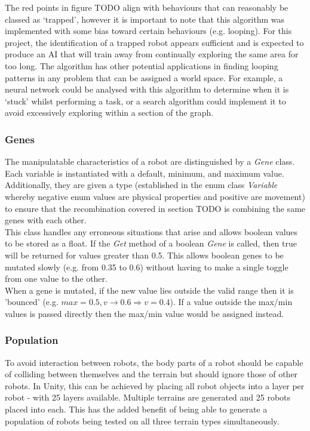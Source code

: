 \documentclass{article}
\begin{document}
The red points in figure TODO align with behaviours that can reasonably be classed as ‘trapped’, however it is important to note that this algorithm was implemented with some bias toward certain behaviours (e.g. looping). For this project, the identification of a trapped robot appears sufficient and is expected to produce an AI that will train away from continually exploring the same area for too long. The algorithm has other potential applications in finding looping patterns in any problem that can be assigned a world space. For example, a neural network could be analysed with this algorithm to determine when it is ‘stuck’ whilst performing a task, or a search algorithm could implement it to avoid excessively exploring within a section of the graph. 


\subsubsection{Genes}
The manipulatable characteristics of a robot are distinguished by a \textit{Gene} class. Each variable is instantiated with a default, minimum, and maximum value. Additionally, they are given a type (established in the enum class \textit{Variable} whereby negative enum values are physical properties and positive are movement) to ensure that the recombination covered in section TODO is combining the same genes with each other. \\
This class handles any erroneous situations that arise and allows boolean values to be stored as a float. If the \textit{Get} method of a boolean \textit{Gene} is called, then true will be returned for values greater than 0.5. This allows boolean genes to be mutated slowly (e.g. from 0.35 to 0.6) without having to make a single toggle from one value to the other. \\
When a gene is mutated, if the new value lies outside the valid range then it is 'bounced' (e.g. $max=0.5, v\rightarrow0.6 \Rightarrow v=0.4$). If a value outside the max/min values is passed directly then the max/min value would be assigned instead.

\subsubsection{Population}
To avoid interaction between robots, the body parts of a robot should be capable of colliding between themselves and the terrain but should ignore those of other robots. In Unity, this can be achieved by placing all robot objects into a layer per robot - with 25 layers available.  Multiple terrains are generated and 25 robots placed into each. This has the added benefit of being able to generate a population of robots being tested on all three terrain types simultaneously. 
\end{document}
